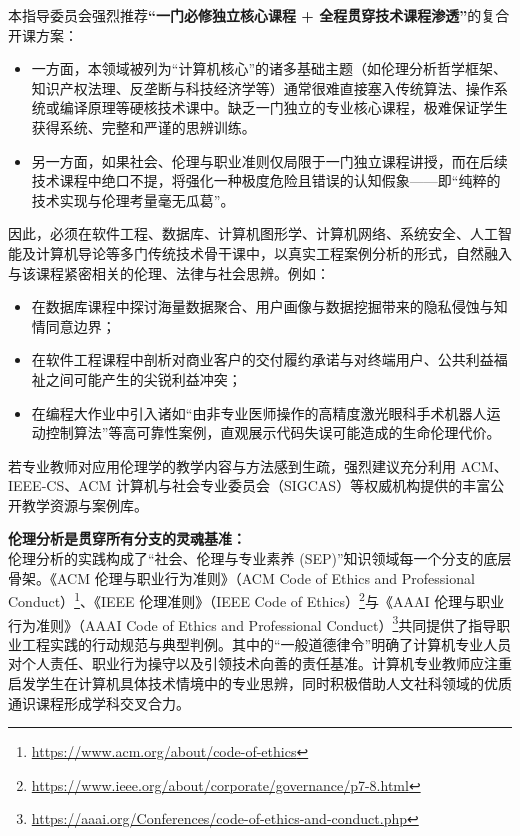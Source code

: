 \begin{preamblebox}[知识领域概述与时代演进]
本指导委员会强烈推荐\textbf{“一门必修独立核心课程 + 全程贯穿技术课程渗透”}的复合开课方案：
\begin{itemize}
    \item 一方面，本领域被列为“计算机核心”的诸多基础主题（如伦理分析哲学框架、知识产权法理、反垄断与科技经济学等）通常很难直接塞入传统算法、操作系统或编译原理等硬核技术课中。缺乏一门独立的专业核心课程，极难保证学生获得系统、完整和严谨的思辨训练。
    \item 另一方面，如果社会、伦理与职业准则仅局限于一门独立课程讲授，而在后续技术课程中绝口不提，将强化一种极度危险且错误的认知假象——即“纯粹的技术实现与伦理考量毫无瓜葛”。
\end{itemize}
因此，必须在软件工程、数据库、计算机图形学、计算机网络、系统安全、人工智能及计算机导论等多门传统技术骨干课中，以真实工程案例分析的形式，自然融入与该课程紧密相关的伦理、法律与社会思辨。例如：
\begin{itemize}
    \item 在数据库课程中探讨海量数据聚合、用户画像与数据挖掘带来的隐私侵蚀与知情同意边界；
    \item 在软件工程课程中剖析对商业客户的交付履约承诺与对终端用户、公共利益福祉之间可能产生的尖锐利益冲突；
    \item 在编程大作业中引入诸如“由非专业医师操作的高精度激光眼科手术机器人运动控制算法”等高可靠性案例，直观展示代码失误可能造成的生命伦理代价。
\end{itemize}
若专业教师对应用伦理学的教学内容与方法感到生疏，强烈建议充分利用 ACM、IEEE-CS、ACM 计算机与社会专业委员会（SIGCAS）等权威机构提供的丰富公开教学资源与案例库。

\textbf{伦理分析是贯穿所有分支的灵魂基准：}\\
伦理分析的实践构成了“社会、伦理与专业素养 (SEP)”知识领域每一个分支的底层骨架。《ACM 伦理与职业行为准则》（ACM Code of Ethics and Professional Conduct）\footnote{\url{https://www.acm.org/about/code-of-ethics}}、《IEEE 伦理准则》（IEEE Code of Ethics）\footnote{\url{https://www.ieee.org/about/corporate/governance/p7-8.html}}与《AAAI 伦理与职业行为准则》（AAAI Code of Ethics and Professional Conduct）\footnote{\url{https://aaai.org/Conferences/code-of-ethics-and-conduct.php}}共同提供了指导职业工程实践的行动规范与典型判例。其中的“一般道德律令”明确了计算机专业人员对个人责任、职业行为操守以及引领技术向善的责任基准。计算机专业教师应注重启发学生在计算机具体技术情境中的专业思辨，同时积极借助人文社科领域的优质通识课程形成学科交叉合力。


\end{preamblebox}
